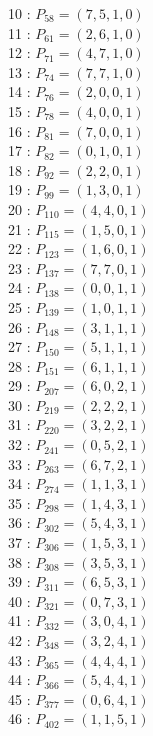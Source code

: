 \documentclass{article}
\begin{document}
{\begin{multicols}{2}
10 : $P_{58}=( 7, 5, 1, 0 )$\\
11 : $P_{61}=( 2, 6, 1, 0 )$\\
12 : $P_{71}=( 4, 7, 1, 0 )$\\
13 : $P_{74}=( 7, 7, 1, 0 )$\\
14 : $P_{76}=( 2, 0, 0, 1 )$\\
15 : $P_{78}=( 4, 0, 0, 1 )$\\
16 : $P_{81}=( 7, 0, 0, 1 )$\\
17 : $P_{82}=( 0, 1, 0, 1 )$\\
18 : $P_{92}=( 2, 2, 0, 1 )$\\
19 : $P_{99}=( 1, 3, 0, 1 )$\\
20 : $P_{110}=( 4, 4, 0, 1 )$\\
21 : $P_{115}=( 1, 5, 0, 1 )$\\
22 : $P_{123}=( 1, 6, 0, 1 )$\\
23 : $P_{137}=( 7, 7, 0, 1 )$\\
24 : $P_{138}=( 0, 0, 1, 1 )$\\
25 : $P_{139}=( 1, 0, 1, 1 )$\\
26 : $P_{148}=( 3, 1, 1, 1 )$\\
27 : $P_{150}=( 5, 1, 1, 1 )$\\
28 : $P_{151}=( 6, 1, 1, 1 )$\\
29 : $P_{207}=( 6, 0, 2, 1 )$\\
30 : $P_{219}=( 2, 2, 2, 1 )$\\
31 : $P_{220}=( 3, 2, 2, 1 )$\\
32 : $P_{241}=( 0, 5, 2, 1 )$\\
33 : $P_{263}=( 6, 7, 2, 1 )$\\
34 : $P_{274}=( 1, 1, 3, 1 )$\\
35 : $P_{298}=( 1, 4, 3, 1 )$\\
36 : $P_{302}=( 5, 4, 3, 1 )$\\
37 : $P_{306}=( 1, 5, 3, 1 )$\\
38 : $P_{308}=( 3, 5, 3, 1 )$\\
39 : $P_{311}=( 6, 5, 3, 1 )$\\
40 : $P_{321}=( 0, 7, 3, 1 )$\\
41 : $P_{332}=( 3, 0, 4, 1 )$\\
42 : $P_{348}=( 3, 2, 4, 1 )$\\
43 : $P_{365}=( 4, 4, 4, 1 )$\\
44 : $P_{366}=( 5, 4, 4, 1 )$\\
45 : $P_{377}=( 0, 6, 4, 1 )$\\
46 : $P_{402}=( 1, 1, 5, 1 )$\\

\end{multicols}}
\end{document}
